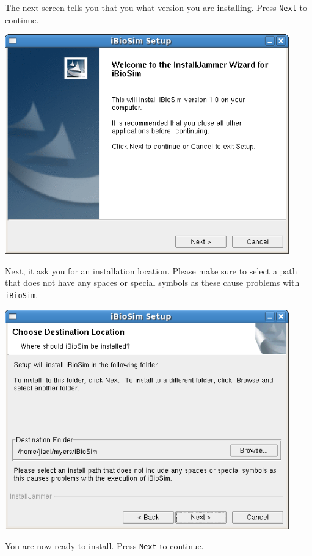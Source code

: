 \documentclass[titlepage,11pt]{article}
\begin{document}
The next screen tells you that you what version you are installing.
Press {\tt Next} to continue.

\includegraphics[height=95mm]{screenshots/setup}

Next, it ask you for an installation location.  Please make sure to
select a path that does not have any spaces or special symbols as
these cause problems with {\tt iBioSim}.

\includegraphics[height=95mm]{screenshots/location}

You are now ready to install.  Press {\tt Next} to continue.
\end{document}

